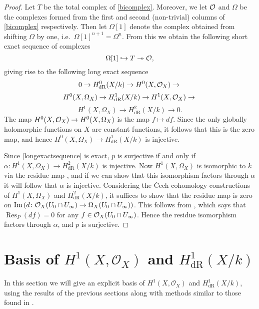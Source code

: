 \documentclass[11pt]{article} %
\theoremstyle{plain}
\theoremstyle{remark}
\newcommand{\cO}{{\cal O}}
\newcommand{\ra}{\rightarrow}
\newcommand{\cech}{\v{C}ech }
\newcommand{\hzero}{{H^0(X,\Omega_X)}}
\newcommand{\hone}{H^1(X,\mathcal{O}_X)}
\newcommand{\derhamhone}{H_{\text {dR}}^1(X/k)}
\DeclareMathOperator{\res}{Res}
\DeclareMathOperator{\Ima}{Im}
\begin{document}
\begin{proof}
Let $T$ be the total complex of \eqref{bicomplex}.
Moreover, we let $\cO$ and $\Omega$ be the complexes formed from the first and second (non-trivial) columns of \eqref{bicomplex} respectively.
Then let $\Omega[1]$ denote the complex obtained from shifting $\Omega$ by one, i.e.~$\Omega[1]^{n+1} = \Omega^n$.
From this we obtain the following short exact sequence of complexes 
\[
\Omega[1] \hookrightarrow T \twoheadrightarrow \cO,
\]
giving rise to the following long exact sequence
\begin{equation*}
0 \ra H^0_{\text {dR}}(X/k) \ra H^0(X,\cO_X) \ra \\
\end{equation*}
\begin{equation}\label{longexactsequence}
 H^0(X,\Omega_X) \ra \derhamhone \ra \hone \ra \\
\end{equation}
\begin{equation*}
 H^1(X,\Omega_X) \ra H^2_{\text {dR}}(X/k) \ra 0.
\end{equation*}
The map $H^0(X,\cO_X) \ra \hzero$ is the map $f \mapsto df$.
Since the only globally holomorphic functions on $X$ are constant functions, it follows that this is the zero map, and hence $\hzero \ra \derhamhone$ is injective.

Since \eqref{longexactsequence} is exact, $p$ is surjective if and only if $\alpha \colon H^1(X,\Omega_X) \ra H^2_{\text {dR}}(X/k)$ is injective.
Now $H^1(X,\Omega_X)$ is isomorphic to $k$ via the residue map \cite[Chap. III, Thm. 7.14.1]{hart}, and if we can show that this isomorphism factors through $\alpha$ it will follow that $\alpha$ is injective.
Considering the \cech cohomology constructions of $H^1(X,\Omega_X)$ and $H^2_{\text {dR}}(X/k)$, it suffices to show that the residue map is zero on $\Ima \left( d \colon \cO_X(U_0 \cap U_\infty) \ra \Omega_X(U_0 \cap U_\infty) \right)$.
This follows from \cite[Chap. III, Thm. 7.14.1 (b)]{hart}, which says that $\res_P(df)=0$ for any $f \in \cO_X(U_0 \cap U_\infty)$.
Hence the residue isomorphism factors through $\alpha$, and $p$ is surjective.
\end{proof}

\section{Basis of $\hone$ and $\derhamhone$}

In this section we will give an explicit basis of $\hone$ and $\derhamhone$, using the results of the previous sections along with methods similar to those found in \cite{canonicalrepresentation}.
\end{document}

